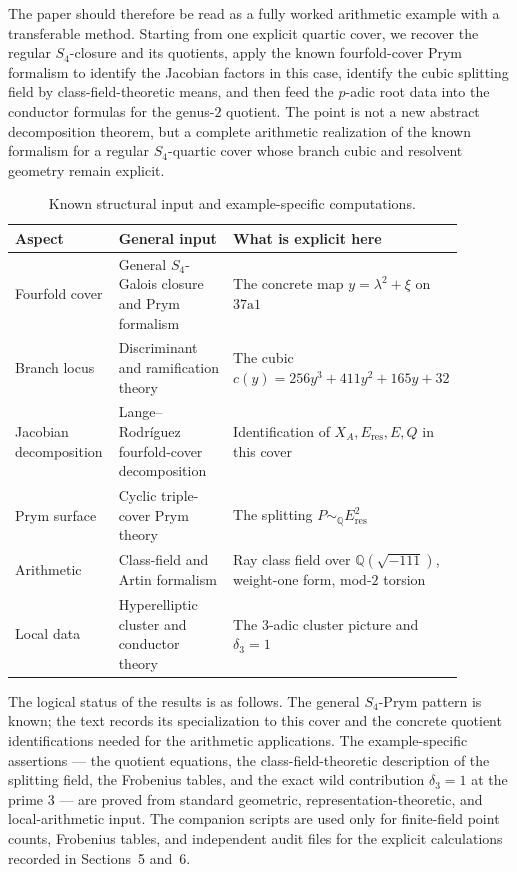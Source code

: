 \documentclass[11pt,letterpaper]{article}
\theoremstyle{plain}
\theoremstyle{remark}
\newcommand{\QQ}{\mathbb{Q}}
\begin{document}
The paper should therefore be read as a fully worked arithmetic example with a transferable method. Starting from one explicit quartic cover, we recover the regular \(S_4\)-closure and its quotients, apply the known fourfold-cover Prym formalism to identify the Jacobian factors in this case, identify the cubic splitting field by class-field-theoretic means, and then feed the \(p\)-adic root data into the conductor formulas for the genus-\(2\) quotient. The point is not a new abstract decomposition theorem, but a complete arithmetic realization of the known formalism for a regular \(S_4\)-quartic cover whose branch cubic and resolvent geometry remain explicit.

\begin{table}[htbp]
\centering
\small
\begin{tabular}{p{0.24\linewidth}|p{0.31\linewidth}|p{0.34\linewidth}}
\textbf{Aspect} & \textbf{General input} & \textbf{What is explicit here}\\ \hline
Fourfold cover & General \(S_4\)-Galois closure and Prym formalism & The concrete map \(y=\lambda^2+\xi\) on \(37\mathrm{a}1\)\\
Branch locus & Discriminant and ramification theory & The cubic \(c(y)=256y^3+411y^2+165y+32\)\\
Jacobian decomposition & Lange--Rodr{\'i}guez fourfold-cover decomposition & Identification of \(X_A,E_{\mathrm{res}},E,Q\) in this cover\\
Prym surface & Cyclic triple-cover Prym theory & The splitting \(P\sim_{\QQ}E_{\mathrm{res}}^2\)\\
Arithmetic & Class-field and Artin formalism & Ray class field over \(\QQ(\sqrt{-111})\), weight-one form, mod-\(2\) torsion\\
Local data & Hyperelliptic cluster and conductor theory & The \(3\)-adic cluster picture and \(\delta_3=1\)
\end{tabular}
\caption{Known structural input and example-specific computations.}
\label{tab:known-vs-new}
\end{table}

The logical status of the results is as follows. The general \(S_4\)-Prym pattern is known; the text records its specialization to this cover and the concrete quotient identifications needed for the arithmetic applications. The example-specific assertions --- the quotient equations, the class-field-theoretic description of the splitting field, the Frobenius tables, and the exact wild contribution \(\delta_3=1\) at the prime \(3\) --- are proved from standard geometric, representation-theoretic, and local-arithmetic input. The companion scripts are used only for finite-field point counts, Frobenius tables, and independent audit files for the explicit calculations recorded in Sections~5 and~6.
\end{document}
